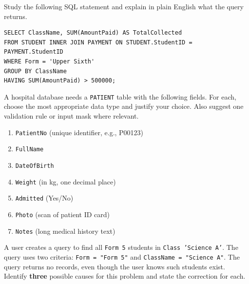 \documentclass[11pt]{article}
\newcounter{popsec}
\newcounter{popsub}
\newcommand{\courssub}[1]{%
  \stepcounter{popsub}%
  \par\vspace{9pt}\noindent{\popxbold\fontsize{11.5}{13}\selectfont\color{popink}{\color{poporange}\thepopsec.\thepopsub}\hspace{6pt}#1}\par\nopagebreak\vspace{4pt}
}
\begin{document}
\begin{exercice}
Study the following SQL statement and explain in plain English what the query returns.
\begin{verbatim}
SELECT ClassName, SUM(AmountPaid) AS TotalCollected
FROM STUDENT INNER JOIN PAYMENT ON STUDENT.StudentID = PAYMENT.StudentID
WHERE Form = 'Upper Sixth'
GROUP BY ClassName
HAVING SUM(AmountPaid) > 500000;
\end{verbatim}
\end{exercice}

\begin{exercice}
A hospital database needs a \texttt{PATIENT} table with the following fields. For each, choose the most appropriate data type and justify your choice. Also suggest one validation rule or input mask where relevant.
\begin{enumerate}
\item \texttt{PatientNo} (unique identifier, e.g., P00123)
\item \texttt{FullName}
\item \texttt{DateOfBirth}
\item \texttt{Weight} (in kg, one decimal place)
\item \texttt{Admitted} (Yes/No)
\item \texttt{Photo} (scan of patient ID card)
\item \texttt{Notes} (long medical history text)
\end{enumerate}
\end{exercice}

\courssub{I prepare for the GCE}

\begin{exercice}
A user creates a query to find all \texttt{Form 5} students in \texttt{Class 'Science A'}. The query uses two criteria: \texttt{Form = "Form 5"} and \texttt{ClassName = "Science A"}. The query returns no records, even though the user knows such students exist. Identify \textbf{three} possible causes for this problem and state the correction for each.
\end{exercice}
\end{document}
